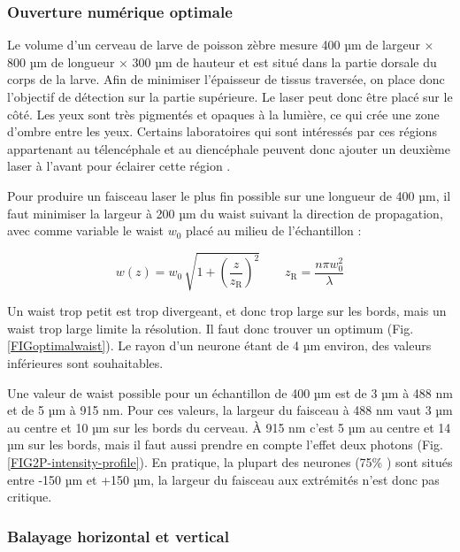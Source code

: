 \subsubsection{Ouverture numérique optimale}

Le volume d'un cerveau de larve de poisson zèbre mesure 400 µm de largeur × 800 µm de longueur × 300 µm de hauteur et est situé dans la partie dorsale du corps de la larve. Afin de minimiser l'épaisseur de tissus traversée, on place donc l'objectif de détection sur la partie supérieure. Le laser peut donc être placé sur le côté. Les yeux sont très pigmentés et opaques à la lumière, ce qui crée une zone d'ombre entre les yeux. Certains laboratoires qui sont intéressés par ces régions appartenant au télencéphale et au diencéphale peuvent donc ajouter un deuxième laser à l'avant pour éclairer cette région \cite{vladimirov_light-sheet_2014}.

Pour produire un faisceau laser le plus fin possible sur une longueur de 400 µm, il faut minimiser la largeur à 200 µm du waist suivant la direction de propagation, avec comme variable le waist $w_0$ placé au milieu de l'échantillon :

$$
w(z) = w_0 \, \sqrt{ 1+ {\left( \frac{z}{z_\mathrm{R}} \right)}^2 } \qquad z_\mathrm{R} = \frac{n \pi w_0^2 }{\lambda}
$$

Un waist trop petit est trop divergeant, et donc trop large sur les bords, mais un waist trop large limite la résolution. Il faut donc trouver un optimum (Fig. \ref{FIGoptimalwaist}). Le rayon d'un neurone étant de 4 µm environ, des valeurs inférieures sont souhaitables.

Une valeur de waist possible pour un échantillon de 400 µm est de 3 µm à 488 nm et de 5 µm à 915 nm. Pour ces valeurs, la largeur du faisceau à 488 nm vaut 3 µm au centre et 10 µm sur les bords du cerveau. À 915 nm c'est 5 µm au centre et 14 µm sur les bords, mais il faut aussi prendre en compte l'effet deux photons (Fig. \ref{FIG2P-intensity-profile}). En pratique, la plupart des neurones (75\% \cite{panier_fast_2013}) sont situés entre -150 µm et +150 µm, la largeur du faisceau aux extrémités n'est donc pas critique.

\subsubsection{Balayage horizontal et vertical}


